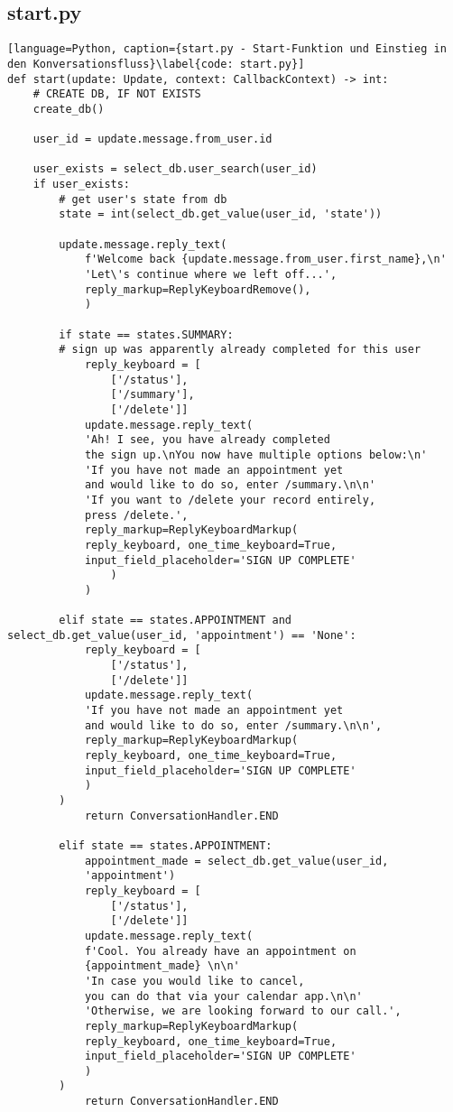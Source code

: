         \subsection{start.py} \label{Implementierung: start.py}

        \begin{lstlisting}[language=Python, caption={start.py - Start-Funktion und Einstieg in den Konversationsfluss}\label{code: start.py}]
def start(update: Update, context: CallbackContext) -> int:
    # CREATE DB, IF NOT EXISTS
    create_db()

    user_id = update.message.from_user.id

    user_exists = select_db.user_search(user_id)
    if user_exists:
        # get user's state from db
        state = int(select_db.get_value(user_id, 'state'))

        update.message.reply_text(
            f'Welcome back {update.message.from_user.first_name},\n'
            'Let\'s continue where we left off...',
            reply_markup=ReplyKeyboardRemove(),
            )

        if state == states.SUMMARY:  
        # sign up was apparently already completed for this user
            reply_keyboard = [
                ['/status'], 
                ['/summary'],
                ['/delete']]
            update.message.reply_text(
            'Ah! I see, you have already completed 
            the sign up.\nYou now have multiple options below:\n'
            'If you have not made an appointment yet 
            and would like to do so, enter /summary.\n\n'
            'If you want to /delete your record entirely, 
            press /delete.',
            reply_markup=ReplyKeyboardMarkup(
            reply_keyboard, one_time_keyboard=True, 
            input_field_placeholder='SIGN UP COMPLETE'
                )
            )

        elif state == states.APPOINTMENT and select_db.get_value(user_id, 'appointment') == 'None':
            reply_keyboard = [
                ['/status'], 
                ['/delete']]
            update.message.reply_text(
            'If you have not made an appointment yet 
            and would like to do so, enter /summary.\n\n',
            reply_markup=ReplyKeyboardMarkup(
            reply_keyboard, one_time_keyboard=True, 
            input_field_placeholder='SIGN UP COMPLETE'
            )
        )
            return ConversationHandler.END

        elif state == states.APPOINTMENT:
            appointment_made = select_db.get_value(user_id, 
            'appointment')
            reply_keyboard = [
                ['/status'], 
                ['/delete']]
            update.message.reply_text(
            f'Cool. You already have an appointment on 
            {appointment_made} \n\n'
            'In case you would like to cancel, 
            you can do that via your calendar app.\n\n'
            'Otherwise, we are looking forward to our call.',
            reply_markup=ReplyKeyboardMarkup(
            reply_keyboard, one_time_keyboard=True, 
            input_field_placeholder='SIGN UP COMPLETE'
            )
        )
            return ConversationHandler.END
        

\end{lstlisting}
